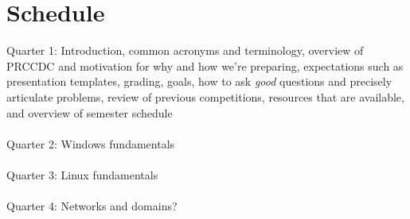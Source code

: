 \documentclass{article}
\begin{document}
\section*{Schedule}
Quarter 1: Introduction, common acronyms and terminology, overview of PRCCDC and motivation for why and how we're preparing, expectations such as presentation templates, grading, goals, how to ask \emph{good} questions and precisely articulate problems, review of previous competitions, resources that are available, and overview of semester schedule\\\\
Quarter 2: Windows fundamentals\\\\
Quarter 3: Linux fundamentals\\\\
Quarter 4: Networks and domains? \\
\end{document}

